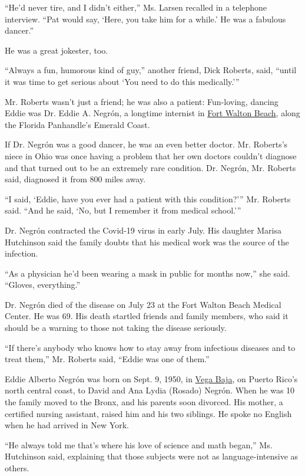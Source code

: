 ``He'd never tire, and I didn't either,'' Ms. Larsen recalled in a
telephone interview. ``Pat would say, `Here, you take him for a while.'
He was a fabulous dancer.''

He was a great jokester, too.

``Always a fun, humorous kind of guy,'' another friend, Dick Roberts,
said, ``until it was time to get serious about `You need to do this
medically.'''

Mr. Roberts wasn't just a friend; he was also a patient: Fun-loving,
dancing Eddie was Dr. Eddie A. Negrón, a longtime internist in
\href{https://www.fwb.org/}{Fort Walton Beach}, along the Florida
Panhandle's Emerald Coast.

If Dr. Negrón was a good dancer, he was an even better doctor. Mr.
Roberts's niece in Ohio was once having a problem that her own doctors
couldn't diagnose and that turned out to be an extremely rare condition.
Dr. Negrón, Mr. Roberts said, diagnosed it from 800 miles away.

``I said, `Eddie, have you ever had a patient with this condition?'''
Mr. Roberts said. ``And he said, `No, but I remember it from medical
school.'''

Dr. Negrón contracted the Covid-19 virus in early July. His daughter
Marisa Hutchinson said the family doubts that his medical work was the
source of the infection.

``As a physician he'd been wearing a mask in public for months now,''
she said. ``Gloves, everything.''

Dr. Negrón died of the disease on July 23 at the Fort Walton Beach
Medical Center. He was 69. His death startled friends and family
members, who said it should be a warning to those not taking the disease
seriously.

``If there's anybody who knows how to stay away from infectious diseases
and to treat them,'' Mr. Roberts said, ``Eddie was one of them.''

Eddie Alberto Negrón was born on Sept. 9, 1950, in
\href{https://welcome.topuertorico.org/city/vegabaja.shtml}{Vega Baja},
on Puerto Rico's north central coast, to David and Ana Lydia (Rosado)
Negrón. When he was 10 the family moved to the Bronx, and his parents
soon divorced. His mother, a certified nursing assistant, raised him and
his two siblings. He spoke no English when he had arrived in New York.

``He always told me that's where his love of science and math began,''
Ms. Hutchinson said, explaining that those subjects were not as
language-intensive as others.

